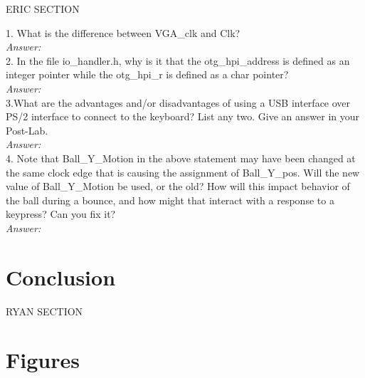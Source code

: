 \documentclass[journal, twocolumn, final,11pt,letterpaper]{IEEEtran}
\begin{document}
ERIC SECTION

1. What is the difference between VGA\_clk and Clk? \\
\textit{Answer:}\\

2. In the file io\_handler.h, why is it that the otg\_hpi\_address is defined as an integer pointer while the otg\_hpi\_r is defined as a char pointer? \\
\textit{Answer:}\\

3.What are the advantages and/or disadvantages of using a USB interface over PS/2 interface to connect to the keyboard? List any two.  Give an answer in your Post-Lab. \\
\textit{Answer:} \\

4.  Note that Ball\_Y\_Motion in the above statement may have been changed at the same clock edge that is causing the assignment of Ball\_Y\_pos.  Will the new value of Ball\_Y\_Motion be used, or the old?  How will this impact behavior of the ball during a bounce, and how might that interact with a response to a keypress?  Can you fix it?\\
\textit{Answer:}\\

\section{Conclusion}
RYAN SECTION

\clearpage
\onecolumn
\section{Figures}



\end{document}
